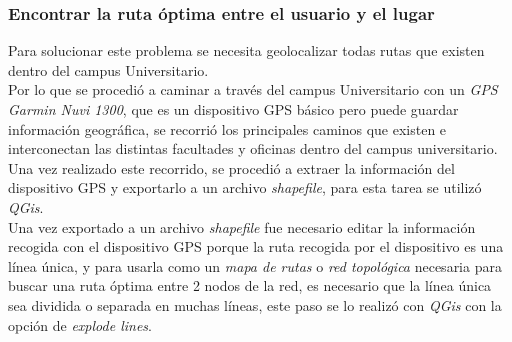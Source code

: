 \subsubsection{Encontrar la ruta óptima entre el usuario y el lugar}


Para solucionar este problema se necesita geolocalizar todas rutas que existen dentro del campus Universitario. \\


%
%


Por lo que se procedió a caminar a través del campus Universitario con un \emph{GPS Garmin Nuvi 1300}, que es un dispositivo GPS básico pero puede guardar información geográfica,  se recorrió los principales caminos que existen e interconectan las distintas facultades y oficinas dentro del campus universitario. Una vez realizado este recorrido, se procedió a extraer la información del dispositivo GPS y exportarlo a un archivo \emph{shapefile}, para esta tarea se utilizó \emph{QGis}. \\


Una vez exportado a un archivo \emph{shapefile} fue necesario editar la información recogida con el dispositivo GPS porque la ruta recogida por el dispositivo es una línea única, y para usarla como un \emph{mapa de rutas} o \emph{red topológica} necesaria para buscar una ruta óptima entre 2 nodos de la red, es necesario que la línea única sea dividida o separada en muchas líneas, este paso se lo realizó con \emph{QGis} con la opción de \emph{explode lines}. \\

